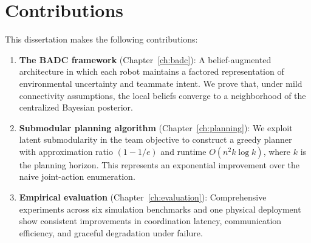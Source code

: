\section{Contributions}

This dissertation makes the following contributions:

\begin{enumerate}[leftmargin=*,itemsep=6pt,topsep=6pt]
  \item \textbf{The BADC framework} (Chapter~\ref{ch:badc}): A belief-augmented
    architecture in which each robot maintains a factored representation of
    environmental uncertainty and teammate intent. We prove that, under mild
    connectivity assumptions, the local beliefs converge to a neighborhood
    of the centralized Bayesian posterior.

  \item \textbf{Submodular planning algorithm} (Chapter~\ref{ch:planning}):
    We exploit latent submodularity in the team objective to construct a greedy
    planner with approximation ratio $(1 - 1/e)$ and runtime $O(n^2 k \log k)$,
    where $k$ is the planning horizon. This represents an exponential improvement
    over the naive joint-action enumeration.

  \item \textbf{Empirical evaluation} (Chapter~\ref{ch:evaluation}):
    Comprehensive experiments across six simulation benchmarks and one physical
    deployment show consistent improvements in coordination latency,
    communication efficiency, and graceful degradation under failure.
\end{enumerate}

